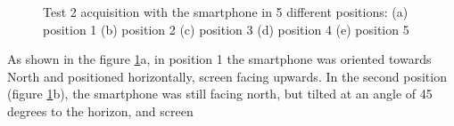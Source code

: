 \begin{figure}[H] 
	\centering
    \newline
    \caption{Test 2 acquisition with the smartphone in 5 different positions: (a) position 1 (b) position 2 (c) position 3 (d) position 4 (e) position 5}
	\label{FIG:test2_setup} 
\end{figure}
As shown in the figure \ref{FIG:test2_setup}a, in position 1 the smartphone was oriented towards North and 
positioned horizontally, screen facing upwards. In the second position (figure \ref{FIG:test2_setup}b),
the smartphone was still facing north, but tilted at an angle of 45 degrees to the horizon, and screen 
